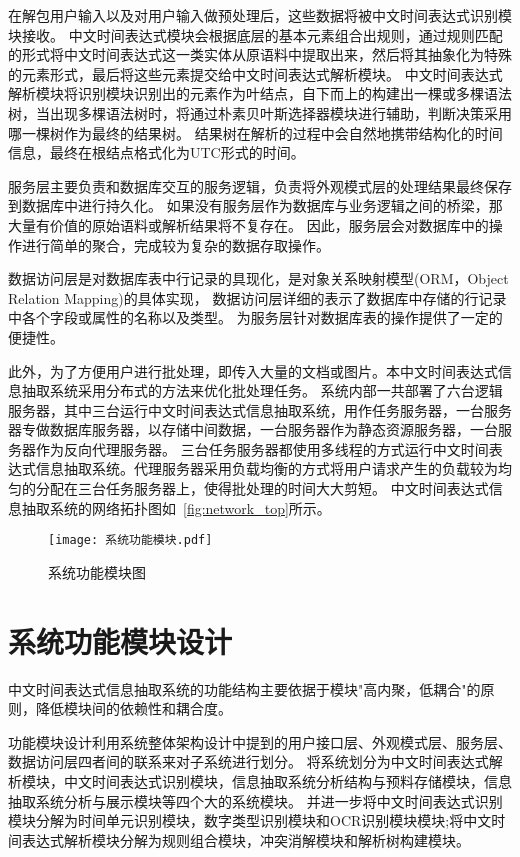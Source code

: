 在解包用户输入以及对用户输入做预处理后，这些数据将被中文时间表达式识别模块接收。
中文时间表达式模块会根据底层的基本元素组合出规则，通过规则匹配的形式将中文时间表达式这一类实体从原语料中提取出来，然后将其抽象化为特殊的元素形式，最后将这些元素提交给中文时间表达式解析模块。
中文时间表达式解析模块将识别模块识别出的元素作为叶结点，自下而上的构建出一棵或多棵语法树，当出现多棵语法树时，将通过朴素贝叶斯选择器模块进行辅助，判断决策采用哪一棵树作为最终的结果树。
结果树在解析的过程中会自然地携带结构化的时间信息，最终在根结点格式化为UTC形式的时间。

服务层主要负责和数据库交互的服务逻辑，负责将外观模式层的处理结果最终保存到数据库中进行持久化。
如果没有服务层作为数据库与业务逻辑之间的桥梁，那大量有价值的原始语料或解析结果将不复存在。
因此，服务层会对数据库中的操作进行简单的聚合，完成较为复杂的数据存取操作。

数据访问层是对数据库表中行记录的具现化，是对象关系映射模型(ORM，Object Relation Mapping)的具体实现，
数据访问层详细的表示了数据库中存储的行记录中各个字段或属性的名称以及类型。
为服务层针对数据库表的操作提供了一定的便捷性。

此外，为了方便用户进行批处理，即传入大量的文档或图片。本中文时间表达式信息抽取系统采用分布式的方法来优化批处理任务。
系统内部一共部署了六台逻辑服务器，其中三台运行中文时间表达式信息抽取系统，用作任务服务器，一台服务器专做数据库服务器，以存储中间数据，一台服务器作为静态资源服务器，一台服务器作为反向代理服务器。
三台任务服务器都使用多线程的方式运行中文时间表达式信息抽取系统。代理服务器采用负载均衡的方式将用户请求产生的负载较为均匀的分配在三台任务服务器上，使得批处理的时间大大剪短。
中文时间表达式信息抽取系统的网络拓扑图如~\ref{fig:network_top}所示。

\begin{figure}[h]
  \centering
  \texttt{[image: 系统功能模块.pdf]}
  \caption{系统功能模块图}
  \label{fig:system_feature}
\end{figure}

\section{系统功能模块设计}

中文时间表达式信息抽取系统的功能结构主要依据于模块"高内聚，低耦合"的原则，降低模块间的依赖性和耦合度。

功能模块设计利用系统整体架构设计中提到的用户接口层、外观模式层、服务层、数据访问层四者间的联系来对子系统进行划分。
将系统划分为中文时间表达式解析模块，中文时间表达式识别模块，信息抽取系统分析结构与预料存储模块，信息抽取系统分析与展示模块等四个大的系统模块。
并进一步将中文时间表达式识别模块分解为时间单元识别模块，数字类型识别模块和OCR识别模块模块;将中文时间表达式解析模块分解为规则组合模块，冲突消解模块和解析树构建模块。



